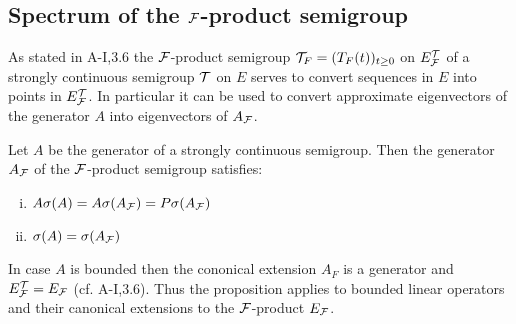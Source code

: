 \subsection{Spectrum of the $\mathcal{F}$-product semigroup}\label{subsec:a3-4.5}
%
As stated in A-I,3.6 the $\mathcal{F}$-product semigroup $\mathcal{T}_{F} = (T_{F}(t))_{t \geq 0}$ on $E_{\mathcal{F}}^{\mathcal{T}}$ of a strongly continuous semigroup $\mathcal{T}$ on $E$ serves to convert sequences in $E$ into points in $E_{\mathcal{F}}^{\mathcal{T}}$.
In particular it can be used to convert approximate eigenvectors of the generator $A$ into eigenvectors of $A_{\mathcal{F}}$.
\begin{proposition}\label{prop:a3-4.6}
Let $A$ be the generator of a strongly continuous semigroup. Then the generator $A_{\mathcal{F}}$ of the $\mathcal{F}$-product semigroup satisfies:
\begin{enumerate}[(i)]
\item 
	$A\sigma(A) = A\sigma(A_{\mathcal{F}}) = P\sigma(A_{\mathcal{F}})$

\item 
	$\sigma(A) = \sigma(A_{\mathcal{F}})$
\end{enumerate}
\end{proposition}
\begin{remark}
In case $A$ is bounded then the cononical extension $A_F$ is a generator and $E_{\mathcal{F}}^{\mathcal{T}} = E_{\mathcal{F}}$ (cf. A-I,3.6).
Thus the proposition applies to bounded linear operators and their canonical extensions to the 
$\mathcal{F}$-product $E_{\mathcal{F}}$.
\end{remark}
